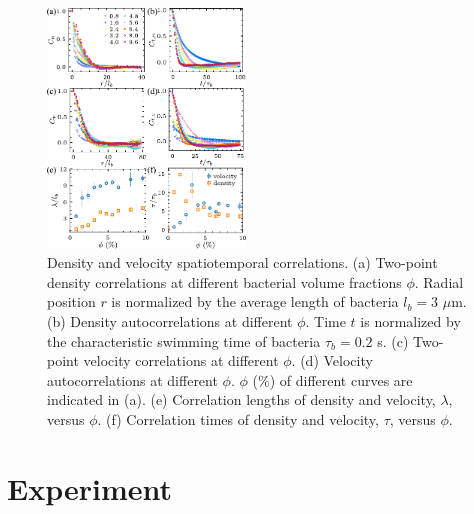 \documentclass[twocolumn,aps,prx,amsmath,amssymb,longbibliography]{revtex4-2}
\begin{document}
\begin{figure}[t]
\begin{center}
\includegraphics[width=0.47\textwidth]{figures/spatiotemporal-correlations/v6.pdf}
\caption[spatiotemporal-correlations.]
{
Density and velocity spatiotemporal correlations. (a) Two-point density correlations at different bacterial volume fractions $\phi$. Radial position $r$ is normalized by the average length of bacteria $l_b = 3$ $\mu$m. (b) Density autocorrelations at different $\phi$. Time $t$ is normalized by the characteristic swimming time of bacteria $\tau_b = 0.2$ s. (c) Two-point velocity correlations at different $\phi$. (d) Velocity autocorrelations at different $\phi$. $\phi$ ($\%$) of different curves are indicated in (a). (e) Correlation lengths of density and velocity, $\lambda$, versus $\phi$. (f) Correlation times of density and velocity, $\tau$, versus $\phi$.
}
\label{fig:spatiotemporal-correlations}
\end{center}
\end{figure}

\section{Experiment}
\end{document}
